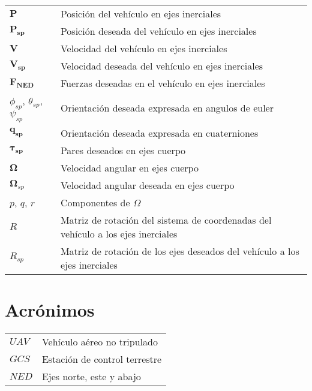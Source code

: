 \chapter*{\notationname}
\pagestyle{especial}
\chaptermark{\notationname}
{}
\begin{longtable}{p{3cm}p{8.5cm}}
$\bm{P}$ & Posición del vehículo en ejes inerciales  \\
$\bm{P_{sp}}$ & Posición deseada del vehículo en ejes inerciales \\
$\bm{V}$ & Velocidad del vehículo en ejes inerciales \\
$\bm{V_{sp}}$ & Velocidad deseada del vehículo en ejes inerciales \\
$\bm{F_{NED}}$ & Fuerzas deseadas en el vehículo en ejes inerciales \\
$\phi_{sp}$, $\theta_{sp}$, $\psi_{sp}$ &  Orientación deseada expresada en angulos de euler \\
$\bm{q_{sp}}$ &  Orientación deseada expresada en cuaterniones \\
$\bm{\tau_{sp}}$ &  Pares deseados en ejes cuerpo \\
$\bm{\Omega}$ & Velocidad angular en ejes cuerpo \\
$\bm{\Omega}_{sp}$ & Velocidad angular deseada en ejes cuerpo \\
$p$, $q$, $r$ & Componentes de $\Omega$\\
$R$  & Matriz de rotación del sistema de coordenadas del vehículo a los ejes inerciales\\
$R_{sp}$  & Matriz de rotación de los ejes deseados del vehículo a los ejes inerciales\\
\end{longtable}
\newpage

\chapter*{Acrónimos}
\pagestyle{especial}
{}
\begin{longtable}{p{3cm}p{8.5cm}}
$UAV$ & Vehículo aéreo no tripulado\\
$GCS$ & Estación de control terrestre \\
$NED$ & Ejes norte, este y abajo \\
\end{longtable}
\newpage

